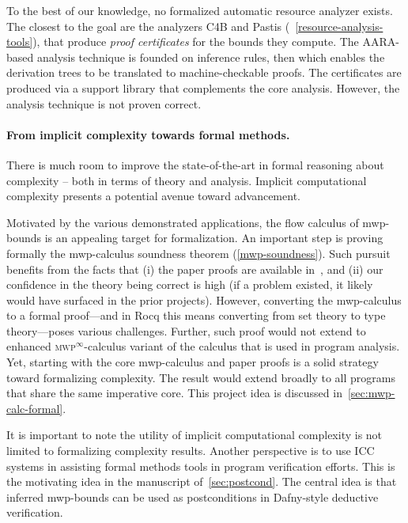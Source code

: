 To the best of our knowledge, no formalized automatic resource analyzer exists.
The closest to the goal are the analyzers C4B and Pastis (\cf~\autoref{resource-analysis-tools}),
that produce \emph{proof certificates} for the bounds they compute.
The AARA-based analysis technique is founded on inference rules, then which enables the derivation trees to be translated to machine-checkable proofs.
The certificates are produced via a support library that complements the core analysis.
However, the analysis {technique} is not proven correct.

\paragraph*{From implicit complexity towards formal methods.}
There is much room to improve the state-of-the-art in formal reasoning about complexity -- both in terms of theory and analysis.
Implicit computational complexity presents a potential avenue toward advancement.

Motivated by the various demonstrated applications, the flow calculus of mwp-bounds is an appealing target for formalization.
An important step is proving formally the mwp-calculus soundness theorem (\autoref{mwp-soundness}).
Such pursuit benefits from the facts that
(i) the paper proofs are available in~\cite{jones2009}, and
(ii) our confidence in the theory being correct is high (\ie if a problem existed, it likely would have surfaced in the prior projects).
However, converting the mwp-calculus to a formal proof---and in Rocq this means converting from set theory to type theory---poses various challenges.
Further, such proof would not extend to enhanced \textsc{mwp}$^\infty$-calculus variant of the calculus that is used in program analysis.
Yet, starting with the core mwp-calculus and paper proofs is a solid strategy toward formalizing complexity.
The result would extend broadly to all programs that share the same imperative core.
This project idea is discussed in~\autoref{sec:mwp-calc-formal}.

It is important to note the utility of implicit computational complexity is not limited to formalizing complexity results.
Another perspective is to use ICC systems in assisting formal methods tools in program verification efforts.
This is the motivating idea in the manuscript of~\autoref{sec:postcond}.
The central idea is that inferred mwp-bounds can be used as postconditions in Dafny-style deductive verification.

